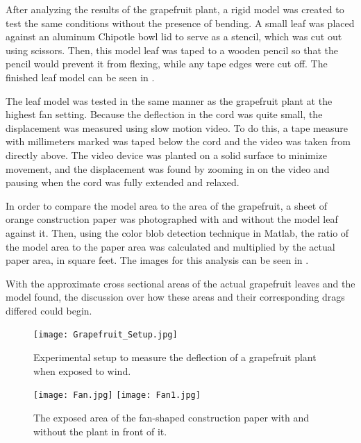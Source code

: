 \documentclass{article}
\begin{document}
After analyzing the results of the grapefruit plant, a rigid model was created to test the same conditions without the presence of bending. A small leaf was placed against an aluminum Chipotle bowl lid to serve as a stencil, which was cut out using scissors. Then, this model leaf was taped to a wooden pencil so that the pencil would prevent it from flexing, while any tape edges were cut off. The finished leaf model can be seen in 
.

The leaf model was tested in the same manner as the grapefruit plant at the highest fan setting. Because the deflection in the cord was quite small, the displacement was measured using slow motion video. To do this, a tape measure with millimeters marked was taped below the cord and the video was taken from directly above. The video device was planted on a solid surface to minimize movement, and the displacement was found by zooming in on the video and pausing when the cord was fully extended and relaxed. 

In order to compare the model area to the area of the grapefruit, a sheet of orange construction paper was photographed with and without the model leaf against it. Then, using the color blob detection technique in Matlab, the ratio of the model area to the paper area was calculated and multiplied by the actual paper area, in square feet. The images for this analysis can be seen in .

With the approximate cross sectional areas of the actual grapefruit leaves and the model found, the discussion over how these areas and their corresponding drags differed could begin.


\begin{figure}
\begin{center}
\texttt{[image: Grapefruit\_Setup.jpg]} 
\end{center}
\caption{Experimental setup to measure the deflection of a grapefruit plant when exposed to wind.}
\label{fig:methods1}
\end{figure}

\begin{figure}
\begin{center}
\texttt{[image: Fan.jpg]}
\texttt{[image: Fan1.jpg]}
\end{center}
\caption{The exposed area of the fan-shaped construction paper with and without the plant in front of it.}
\label{fig:methods2}
\end{figure}
\end{document}

